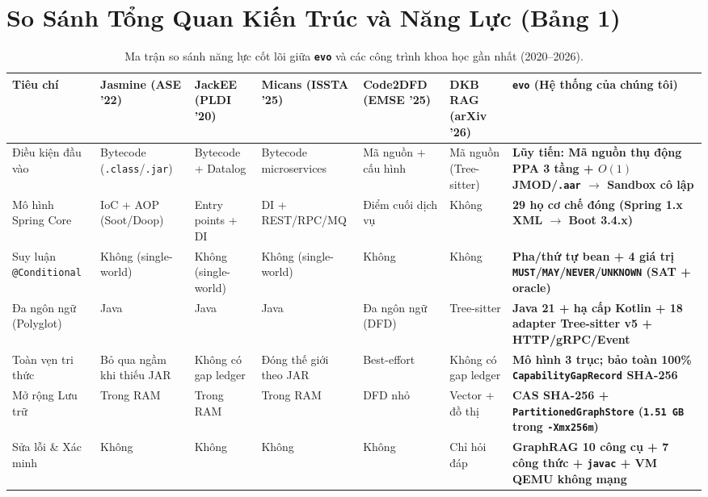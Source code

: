 \documentclass[10pt,a4paper]{article}
\begin{document}
\section{So Sánh Tổng Quan Kiến Trúc và Năng Lực (Bảng 1)}

\begin{table}[htbp]
\centering
\caption{Ma trận so sánh năng lực cốt lõi giữa \textbf{\texttt{evo}} và các công trình khoa học gần nhất (2020--2026).}
\label{tab:overview}
\scriptsize
\renewcommand{\arraystretch}{1.25}
\begin{tabularx}{\textwidth}{>{\raggedright\arraybackslash}p{2.3cm} >{\raggedright\arraybackslash}X >{\raggedright\arraybackslash}X >{\raggedright\arraybackslash}X >{\raggedright\arraybackslash}X >{\raggedright\arraybackslash}X >{\raggedright\arraybackslash}p{4.1cm}}
\toprule
\textbf{Tiêu chí} & \textbf{Jasmine} (ASE '22) & \textbf{JackEE} (PLDI '20) & \textbf{Micans} (ISSTA '25) & \textbf{Code2DFD} (EMSE '25) & \textbf{DKB RAG} (arXiv '26) & \textbf{\texttt{evo} (Hệ thống của chúng tôi)} \\
\midrule
Điều kiện đầu vào & Bytecode (\texttt{.class}/\texttt{.jar}) & Bytecode + Datalog & Bytecode microservices & Mã nguồn + cấu hình & Mã nguồn (Tree-sitter) & \textbf{Lũy tiến: Mã nguồn thụ động PPA 3 tầng + $O(1)$ JMOD/\texttt{.aar} $\rightarrow$ Sandbox cô lập} \\
Mô hình Spring Core & IoC + AOP (Soot/Doop) & Entry points + DI & DI + REST/RPC/MQ & Điểm cuối dịch vụ & Không & \textbf{29 họ cơ chế đóng (Spring 1.x XML $\rightarrow$ Boot 3.4.x)} \\
Suy luận \texttt{@Conditional} & Không (single-world) & Không (single-world) & Không (single-world) & Không & Không & \textbf{Pha/thứ tự bean + 4 giá trị \texttt{MUST}/\texttt{MAY}/\texttt{NEVER}/\texttt{UNKNOWN} (SAT + oracle)} \\
Đa ngôn ngữ (Polyglot) & Java & Java & Java & Đa ngôn ngữ (DFD) & Tree-sitter & \textbf{Java 21 + hạ cấp Kotlin + 18 adapter Tree-sitter v5 + HTTP/gRPC/Event} \\
Toàn vẹn tri thức & Bỏ qua ngầm khi thiếu JAR & Không có gap ledger & Đóng thế giới theo JAR & Best-effort & Không có gap ledger & \textbf{Mô hình 3 trục; bảo toàn 100\% \texttt{CapabilityGapRecord} SHA-256} \\
Mở rộng Lưu trữ & Trong RAM & Trong RAM & Trong RAM & DFD nhỏ & Vector + đồ thị & \textbf{CAS SHA-256 + \texttt{PartitionedGraphStore} (\texttt{1.51\,GB} trong \texttt{-Xmx256m})} \\
Sửa lỗi \& Xác minh & Không & Không & Không & Không & Chỉ hỏi đáp & \textbf{GraphRAG 10 công cụ + 7 công thức + \texttt{javac} + VM QEMU không mạng} \\
\bottomrule
\end{tabularx}
\end{table}
\end{document}
